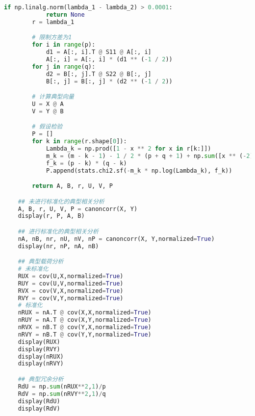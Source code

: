 \documentclass[withoutpreface]{cumcmthesis}
\begin{document}
\begin{lstlisting}[language=python ]
        if np.linalg.norm(lambda_1 - lambda_2) > 0.0001:
            return None
        r = lambda_1

        # 限制方差为1
        for i in range(p):
            d1 = A[:, i].T @ S11 @ A[:, i]
            A[:, i] = A[:, i] * (d1 ** (-1 / 2))
        for j in range(q):
            d2 = B[:, j].T @ S22 @ B[:, j]
            B[:, j] = B[:, j] * (d2 ** (-1 / 2))

        # 计算典型向量
        U = X @ A
        V = Y @ B

        # 假设检验
        P = []
        for k in range(r.shape[0]):
            Lambda_k = np.prod([1 - x ** 2 for x in r[k:]])
            m_k = (m - k - 1) - 1 / 2 * (p + q + 1) + np.sum([x ** (-2) for x in r[:k]])
            f_k = (p - k) * (q - k)
            P.append(stats.chi2.sf(-m_k * np.log(Lambda_k), f_k))

        return A, B, r, U, V, P

    ## 未进行标准化的典型相关分析
    A, B, r, U, V, P = canoncorr(X, Y)
    display(r, P, A, B)

    ## 进行标准化的典型相关分析
    nA, nB, nr, nU, nV, nP = canoncorr(X, Y,normalized=True)
    display(nr, nP, nA, nB)

    ## 典型载荷分析
    # 未标准化
    RUX = cov(U,X,normalized=True)
    RUY = cov(U,V,normalized=True)
    RVX = cov(V,X,normalized=True)
    RVY = cov(V,Y,normalized=True)
    # 标准化
    nRUX = nA.T @ cov(X,X,normalized=True)
    nRUY = nA.T @ cov(X,Y,normalized=True)
    nRVX = nB.T @ cov(Y,X,normalized=True)
    nRVY = nB.T @ cov(Y,Y,normalized=True)
    display(RUX)
    display(RVY)
    display(nRUX)
    display(nRVY)

    ## 典型冗余分析
    RdU = np.sum(nRUX**2,1)/p
    RdV = np.sum(nRVY**2,1)/q
    display(RdU)
    display(RdV)
\end{lstlisting}
\end{document}

